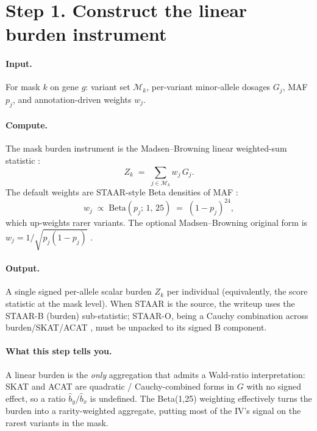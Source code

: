 \documentclass[11pt]{article}
\begin{document}
\section*{Step 1. Construct the linear burden instrument}

\paragraph{Input.} For mask $k$ on gene $g$: variant set $\mathcal{M}_k$, per-variant minor-allele dosages $G_j$, MAF $p_j$, and annotation-driven weights $w_j$.

\paragraph{Compute.} The mask burden instrument is the Madsen--Browning linear weighted-sum statistic \citep{MadsenBrowning2009}:
\begin{equation}
Z_k \;=\; \sum_{j\in\mathcal{M}_k} w_j\, G_j.
\label{eq:burden}
\end{equation}
The default weights are STAAR-style Beta densities of MAF \citep{LiSTAAR2020,WuSKAT2011}:
\begin{equation}
w_j \;\propto\; \mathrm{Beta}\!\left(p_j;\, 1,\, 25\right) \;=\; (1-p_j)^{24},
\label{eq:beta-weights}
\end{equation}
which up-weights rarer variants. The optional Madsen--Browning original form is $w_j = 1/\sqrt{p_j(1-p_j)}$ \citep{MadsenBrowning2009}.

\paragraph{Output.} A single signed per-allele scalar burden $Z_k$ per individual (equivalently, the score statistic at the mask level). When STAAR is the source, the writeup uses the STAAR-B (burden) sub-statistic; STAAR-O, being a Cauchy combination across burden/SKAT/ACAT \citep{LiSTAAR2020}, must be unpacked to its signed B component.

\paragraph{What this step tells you.} A linear burden is the \emph{only} aggregation that admits a Wald-ratio interpretation: SKAT and ACAT are quadratic / Cauchy-combined forms in $G$ with no signed effect, so a ratio $\hat b_y/\hat b_x$ is undefined. The Beta(1,25) weighting effectively turns the burden into a rarity-weighted aggregate, putting most of the IV's signal on the rarest variants in the mask.
\end{document}
